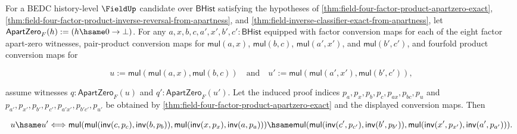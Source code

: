 \begin{theorem}
\label{thm:field-four-factor-inverse-classifier-exact-from-apartness}
For a BEDC history-level $\FieldUp$ candidate over $\mathsf{BHist}$ satisfying
the hypotheses of
\autoref{thm:field-four-factor-product-apartzero-exact},
\autoref{thm:field-four-factor-product-inverse-reversal-from-apartness}, and
\autoref{thm:field-inverse-classifier-exact-from-apartness}, let
$\mathsf{ApartZero}_F(h):=(h\hsame0\to\bot)$. For any
$a,x,b,c,a',x',b',c':\mathsf{BHist}$ equipped with factor conversion maps for
each of the eight factor apart-zero witnesses, pair-product conversion maps for
$\mathsf{mul}(a,x)$, $\mathsf{mul}(b,c)$, $\mathsf{mul}(a',x')$, and
$\mathsf{mul}(b',c')$, and fourfold product conversion maps for

$$
u:=\mathsf{mul}(\mathsf{mul}(a,x),\mathsf{mul}(b,c))
\quad\text{and}\quad
u':=\mathsf{mul}(\mathsf{mul}(a',x'),\mathsf{mul}(b',c')),
$$

assume witnesses $q:\mathsf{ApartZero}_F(u)$ and
$q':\mathsf{ApartZero}_F(u')$. Let the induced proof indices
$p_a,p_x,p_b,p_c,p_{ax},p_{bc},p_u$ and
$p_{a'},p_{x'},p_{b'},p_{c'},p_{a'x'},p_{b'c'},p_{u'}$ be obtained by
\autoref{thm:field-four-factor-product-apartzero-exact} and the displayed
conversion maps. Then

$$
u\hsame u'
\Longleftrightarrow
\mathsf{mul}(\mathsf{mul}(\mathsf{inv}(c,p_c),\mathsf{inv}(b,p_b)),
\mathsf{mul}(\mathsf{inv}(x,p_x),\mathsf{inv}(a,p_a)))
\hsame
\mathsf{mul}(\mathsf{mul}(\mathsf{inv}(c',p_{c'}),\mathsf{inv}(b',p_{b'})),
\mathsf{mul}(\mathsf{inv}(x',p_{x'}),\mathsf{inv}(a',p_{a'}))).
$$
\end{theorem}
